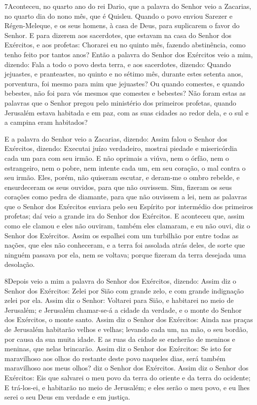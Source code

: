 \medskip

\lettrine{7} Aconteceu, no quarto ano do rei Dario, que a
palavra do Senhor veio a Zacarias, no quarto dia do nono mês, que é
Quisleu. Quando o povo enviou Sarezer e Régen-Meleque, e os seus
homens, à casa de Deus, para suplicarem o favor do Senhor. E
para dizerem aos sacerdotes, que estavam na casa do Senhor dos
Exércitos, e aos profetas: Chorarei eu no quinto mês, fazendo
abstinência, como tenho feito por tantos anos? Então a palavra
do Senhor dos Exércitos veio a mim, dizendo: Fala a todo o povo
desta terra, e aos sacerdotes, dizendo: Quando jejuastes, e
pranteastes, no quinto e no sétimo mês, durante estes setenta anos,
porventura, foi mesmo para mim que jejuastes? Ou quando
comestes, e quando bebestes, não foi para vós mesmos que comestes e
bebestes? Não foram estas as palavras que o Senhor pregou pelo
ministério dos primeiros profetas, quando Jerusalém estava habitada
e em paz, com as suas cidades ao redor dela, e o sul e a campina
eram habitados?

E a palavra do Senhor veio a Zacarias, dizendo: Assim falou o
Senhor dos Exércitos, dizendo: Executai juízo verdadeiro, mostrai
piedade e misericórdia cada um para com seu irmão. E não
oprimais a viúva, nem o órfão, nem o estrangeiro, nem o pobre, nem
intente cada um, em seu coração, o mal contra o seu irmão.
Eles, porém, não quiseram escutar, e deram-me o ombro
rebelde, e ensurdeceram os seus ouvidos, para que não ouvissem.
Sim, fizeram os seus corações como pedra de diamante, para
que não ouvissem a lei, nem as palavras que o Senhor dos Exércitos
enviara pelo seu Espírito por intermédio dos primeiros profetas; daí
veio a grande ira do Senhor dos Exércitos. E aconteceu que,
assim como ele clamou e eles não ouviram, também eles clamaram, e eu
não ouvi, diz o Senhor dos Exércitos. Assim os espalhei com
um turbilhão por entre todas as nações, que eles não conheceram, e a
terra foi assolada atrás deles, de sorte que ninguém passava por
ela, nem se voltava; porque fizeram da terra desejada uma desolação.

\medskip

\lettrine{8} Depois veio a mim a palavra do Senhor dos
Exércitos, dizendo: Assim diz o Senhor dos Exércitos: Zelei por
Sião com grande zelo, e com grande indignação zelei por ela.
Assim diz o Senhor: Voltarei para Sião, e habitarei no meio de
Jerusalém; e Jerusalém chamar-se-á a cidade da verdade, e o monte do
Senhor dos Exércitos, o monte santo. Assim diz o Senhor dos
Exércitos: Ainda nas praças de Jerusalém habitarão velhos e velhas;
levando cada um, na mão, o seu bordão, por causa da sua muita idade.
E as ruas da cidade se encherão de meninos e meninas, que nelas
brincarão. Assim diz o Senhor dos Exércitos: Se isto for
maravilhoso aos olhos do restante deste povo naqueles dias, será
também maravilhoso aos meus olhos? diz o Senhor dos Exércitos.
Assim diz o Senhor dos Exércitos: Eis que salvarei o meu povo da
terra do oriente e da terra do ocidente; E trá-los-ei, e
habitarão no meio de Jerusalém; e eles serão o meu povo, e eu lhes
serei o seu Deus em verdade e em justiça.

